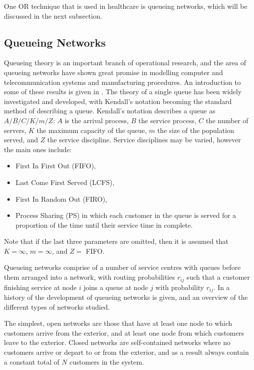 \documentclass{article}
\begin{document}
One OR technique that is used in healthcare is queueing networks, which will be discussed in the next subsection.

\subsection{Queueing Networks}

Queueing theory is an important branch of operational research, and the area of queueing networks have shown great promise in modelling computer and telecommunication systems and manufacturing procedures.
An introduction to some of these results is given in \cite{stewart09}.
The theory of a single queue has been widely investigated and developed, with Kendall's notation becoming the standard method of describing a queue.
Kendall's notation describes a queue as $A/B/C/K/m/Z$: $A$ is the arrival process, $B$ the service process, $C$ the number of servers, $K$ the maximum capacity of the queue, $m$ the size of the population served, and $Z$ the service discipline.
Service disciplines may be varied, however the main ones include:

\begin{itemize}
    \item First In First Out (FIFO),
    \item Last Come First Served (LCFS),
    \item First In Random Out (FIRO),
    \item Process Sharing (PS) in which each customer in the queue is served for a proportion of the time until their service time in complete.
\end{itemize}
Note that if the last three parameters are omitted, then it is assumed that $K = \infty$, $m = \infty$, and $Z =$ FIFO.

Queueing networks comprise of a number of service centres with queues before
them arranged into a network, with routing probabilities $r_{ij}$ such that a
customer finishing service at node $i$ joins a queue at node $j$ with
probability $r_{ij}$.
In \cite{rege90} a history of the development of queueing networks is given, and an overview of the different types of networks studied.

The simplest, open networks are those that have at least one node to which
customers arrive from the exterior, and at least one node from which customers leave to the exterior.
Closed networks are self-contained networks where no customers arrive or depart to or from the exterior, and as a result always contain a constant total of $N$ customers in the system.
\end{document}
